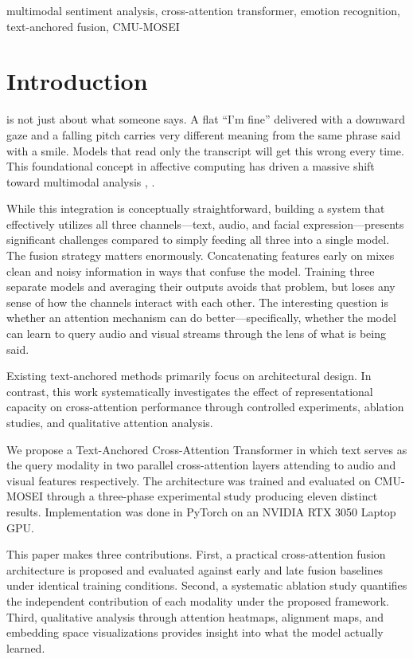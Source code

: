 \documentclass[conference]{IEEEtran}
\begin{document}
\begin{IEEEkeywords}
multimodal sentiment analysis, cross-attention transformer, emotion recognition, text-anchored fusion, CMU-MOSEI
\end{IEEEkeywords}

\section{Introduction}
 is not just about what someone says. A flat ``I'm fine'' delivered with a downward gaze and a falling pitch carries very different meaning from the same phrase said with a smile. Models that read only the transcript will get this wrong every time. This foundational concept in affective computing \cite{picard2000affective} has driven a massive shift toward multimodal analysis \cite{baltrusaitis2019multimodal}, \cite{poria2017review}.

While this integration is conceptually straightforward, building a system that effectively utilizes all three channels---text, audio, and facial expression---presents significant challenges compared to simply feeding all three into a single model. The fusion strategy matters enormously. Concatenating features early on mixes clean and noisy information in ways that confuse the model. Training three separate models and averaging their outputs avoids that problem, but loses any sense of how the channels interact with each other. The interesting question is whether an attention mechanism can do better---specifically, whether the model can learn to query audio and visual streams through the lens of what is being said.

Existing text-anchored methods primarily focus on architectural design. In contrast, this work systematically investigates the effect of representational capacity on cross-attention performance through controlled experiments, ablation studies, and qualitative attention analysis.

We propose a Text-Anchored Cross-Attention Transformer in which text serves as the query modality in two parallel cross-attention layers attending to audio and visual features respectively. The architecture was trained and evaluated on CMU-MOSEI through a three-phase experimental study producing eleven distinct results. Implementation was done in PyTorch on an NVIDIA RTX 3050 Laptop GPU.

This paper makes three contributions. First, a practical cross-attention fusion architecture is proposed and evaluated against early and late fusion baselines under identical training conditions. Second, a systematic ablation study quantifies the independent contribution of each modality under the proposed framework. Third, qualitative analysis through attention heatmaps, alignment maps, and embedding space visualizations provides insight into what the model actually learned.
\end{document}

